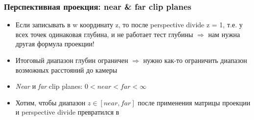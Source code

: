 \documentclass[10pt]{beamer}
\begin{document}
\begin{frame}[fragile]
\frametitle{Перспективная проекция: near \& far clip planes}
\begin{itemize}
\item Если записывать в w координату z, то после perspective divide z = 1, т.е. у всех точек одинаковая глубина, и не работает тест глубины \begin{math}\Longrightarrow\end{math} нам нужна другая формула проекции!
\pause
\item Итоговый диапазон глубин ограничен \begin{math}\Longrightarrow\end{math} нужно как-то ограничить диапазон возможных расстояний до камеры
\pause
\item \textit{Near} и \textit{far} clip planes: \begin{math}0 < near < far < \infty\end{math}
\pause
\item Хотим, чтобы диапазон \begin{math}z\in [near,far]\end{math} после применения матрицы проекции и perspective divide превратился в \begin{math}[-1,1]\end{math}
\end{itemize}
\end{frame}
\end{document}

